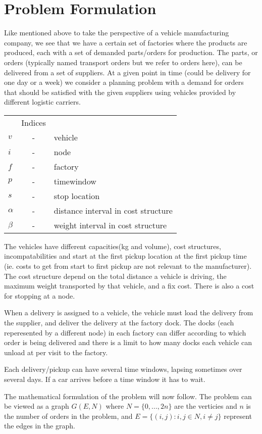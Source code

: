 \documentclass[a4paper,10pt]{article}
\begin{document}
\section{Problem Formulation} \label{sec:PForm}
Like mentioned above to take the perspective of a vehicle manufacturing company, we see that we have a certain set of factories where the products are produced, each with a set of demanded parts/orders for production.
The parts, or orders (typically named transport orders but we refer to orders here), can be delivered from a set of suppliers.
At a given point in time (could be delivery for one day or a week) we consider a planning problem with a demand for orders that should be satisfied with the given suppliers using vehicles provided by different logistic carriers.
\linebreak


\begin{tabular}{l c l }
              &Indices          			        	\\ 
    $v      $ &-& vehicle     					        \\
    $i      $ &-& node 	        				        \\
    $f      $ &-& factory 		                                \\
    $p      $ &-& timewindow                    		        \\
    $s      $ &-& stop location 				        \\
    $\alpha $ &-& distance interval in cost structure		        \\
    $\beta  $ &-& weight interval in cost structure		        \\
\end{tabular}
\linebreak
\linebreak
\par

The vehicles have different capacities(kg and volume), cost structures, incompatabilities and start at the first pickup location at the first pickup time (ie. costs to get from start to first pickup are not relevant to the manufacturer).
The cost structure depend on the total distance a vehicle is driving, the maximum weight transported by that vehicle, and a fix cost. There is also a cost for stopping at a node. \par
When a delivery is assigned to a vehicle, the vehicle must load the delivery from the supplier, and deliver the delivery at the factory dock.
The docks (each reperesented by a different node) in each factory can differ according to which order is being delivered and there is a limit to how many docks each vehicle can unload at per visit to the factory. \par
Each delivery/pickup can have several time windows, lapsing sometimes over several days. If a car arrives before a time window it has to wait. \par
The mathematical formulation of the problem will now follow. 
The problem can be viewed as a graph $G(E,N)$ where $N=\{0,...,2n\}$ are the verticies and $n$ is the number of orders in the problem, and $E=\{(i,j): i,j \in N, i \neq j\}$ represent the edges in the graph.
\linebreak
\end{document}
